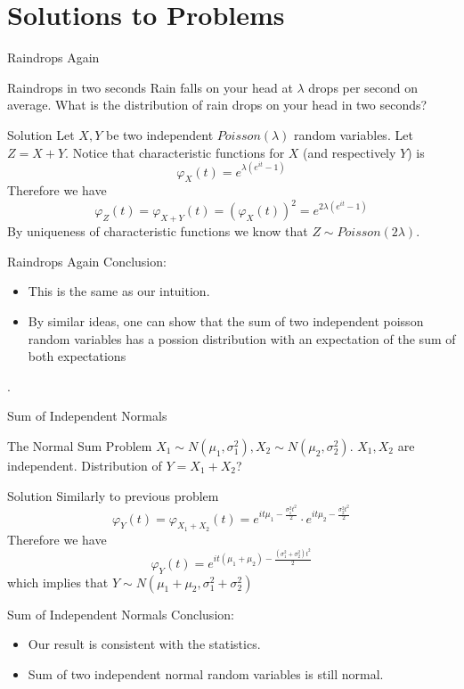 \documentclass{beamer}
\begin{document}
\section{Solutions to Problems}
\begin{frame}{Raindrops Again}
\begin{block}{Raindrops in two seconds}
	Rain falls on your head at $\lambda$ drops per second on average. What is the distribution of rain drops on your head in two seconds?\pause
\end{block}\pause
\begin{exampleblock}{Solution}
	Let $X,Y$ be two independent $Poisson(\lambda)$ random variables. Let $Z=X+Y$.
	Notice that characteristic functions for $X$ (and respectively $Y$) is $$\varphi_X(t)=e^{\lambda(e^{it}-1)}$$
	Therefore we have $$\varphi_Z(t)=\varphi_{X+Y}(t)=(\varphi_X(t))^2=e^{2\lambda(e^{it}-1)}$$
	By uniqueness of characteristic functions we know that $Z\sim Poisson(2\lambda)$.
\end{exampleblock}
\end{frame}
\begin{frame}{Raindrops Again}
Conclusion:
\begin{itemize}
\item This is the same as our intuition.
\item By similar ideas, one can show that the sum of two independent poisson random variables has a possion distribution with an expectation of the sum of both expectations
\end{itemize}.
\end{frame}
\begin{frame}{Sum of Independent Normals}
\begin{block}{The Normal Sum Problem}
$X_1\sim N(\mu_1,\sigma_1^2), X_2\sim N(\mu_2,\sigma_2^2).$ $X_1,X_2$ are independent. Distribution of $Y=X_1+X_2$?\pause
\end{block}
\begin{exampleblock}{Solution}
	Similarly to previous problem $$\varphi_{Y}(t)=\varphi_{X_1+X_2}(t)=e^{it\mu_1-\frac{\sigma_1^2 t^2}{2}}\cdot e^{it\mu_2-\frac{\sigma_2^2 t^2}{2}}$$
	Therefore we have $$\varphi_Y(t)=e^{it(\mu_1+\mu_2)-\frac{(\sigma_1^2+\sigma_2^2)t^2}{2}}$$
	which implies that $Y\sim N(\mu_1+\mu_2,\sigma_1^2+\sigma_2^2)$
\end{exampleblock}
\end{frame}
\begin{frame}{Sum of Independent Normals}
	Conclusion:
	\begin{itemize}
		\item Our result is consistent with the statistics.
		\item Sum of two independent normal random variables is still normal.
	\end{itemize}
\end{frame}
\end{document}
